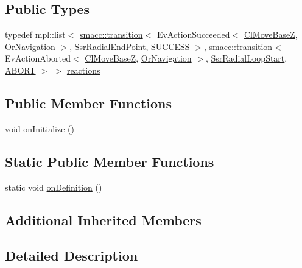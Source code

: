 \subsection*{Public Types}
\begin{DoxyCompactItemize}
\item 
typedef mpl\+::list$<$ \hyperlink{classsmacc_1_1transition}{smacc\+::transition}$<$ Ev\+Action\+Succeeded$<$ \hyperlink{classmove__base__z__client_1_1ClMoveBaseZ}{Cl\+Move\+BaseZ}, \hyperlink{classsm__dance__bot__2_1_1OrNavigation}{Or\+Navigation} $>$, \hyperlink{structsm__dance__bot__2_1_1radial__motion__states_1_1SsrRadialEndPoint}{Ssr\+Radial\+End\+Point}, \hyperlink{classSUCCESS}{S\+U\+C\+C\+E\+SS} $>$, \hyperlink{classsmacc_1_1transition}{smacc\+::transition}$<$ Ev\+Action\+Aborted$<$ \hyperlink{classmove__base__z__client_1_1ClMoveBaseZ}{Cl\+Move\+BaseZ}, \hyperlink{classsm__dance__bot__2_1_1OrNavigation}{Or\+Navigation} $>$, \hyperlink{structsm__dance__bot__2_1_1radial__motion__states_1_1SsrRadialLoopStart}{Ssr\+Radial\+Loop\+Start}, \hyperlink{classABORT}{A\+B\+O\+RT} $>$ $>$ \hyperlink{structsm__dance__bot__2_1_1radial__motion__states_1_1SsrRadialRotate_a6288245a784f41b38cbd035031d18042}{reactions}
\end{DoxyCompactItemize}
\subsection*{Public Member Functions}
\begin{DoxyCompactItemize}
\item 
void \hyperlink{structsm__dance__bot__2_1_1radial__motion__states_1_1SsrRadialRotate_a092912865feae3c3f3e4b82d0f6d14a1}{on\+Initialize} ()
\end{DoxyCompactItemize}
\subsection*{Static Public Member Functions}
\begin{DoxyCompactItemize}
\item 
static void \hyperlink{structsm__dance__bot__2_1_1radial__motion__states_1_1SsrRadialRotate_a3d4ba3c0ca5e5b330f05bc5da05a7529}{on\+Definition} ()
\end{DoxyCompactItemize}
\subsection*{Additional Inherited Members}


\subsection{Detailed Description}



